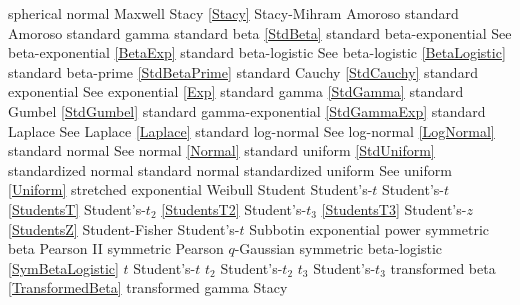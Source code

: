 spherical normal				\dotfill	Maxwell							\ncite	%
Stacy 						\dotfill	\eqref{Stacy} 						\ncite	%
Stacy-Mihram					\dotfill	Amoroso							\ncite	%
standard Amoroso				\dotfill	standard gamma 					\ncite	%
standard beta					\dotfill	\eqref{StdBeta} 					\ncite	%
standard beta-exponential			\dotfill	See beta-exponential \eqref{BetaExp}	\ncite	%
standard beta-logistic			\dotfill	See beta-logistic \eqref{BetaLogistic}		\ncite	%
standard beta-prime				\dotfill	\eqref{StdBetaPrime}				\ncite	%
standard Cauchy				\dotfill	\eqref{StdCauchy} 					\ncite	%
standard exponential				\dotfill	See exponential \eqref{Exp} 			\ncite	%
standard gamma 				\dotfill	\eqref{StdGamma} 					\ncite	%
standard Gumbel 				\dotfill	\eqref{StdGumbel} 					\ncite	%
standard gamma-exponential		\dotfill	\eqref{StdGammaExp} 				\ncite	%
standard Laplace				\dotfill	See Laplace \eqref{Laplace}			\ncite	%
standard log-normal				\dotfill	See log-normal \eqref{LogNormal} 		\ncite	%
standard normal 				\dotfill	See normal \eqref{Normal} 			\ncite	%
standard uniform				\dotfill	\eqref{StdUniform}					\ncite	%
standardized normal 				\dotfill	standard normal					\ncite	%
standardized uniform 			\dotfill	See uniform \eqref{Uniform}			\ncite	%
stretched exponential 			\dotfill	Weibull 								
Student						\dotfill 	Student's-$t$						\ncite	%
Student's-$t$					\dotfill	\eqref{StudentsT}  					\ncite	%
Student's-$t_2$					\dotfill	\eqref{StudentsT2}  					\ncite	%
Student's-$t_3$					\dotfill	\eqref{StudentsT3}  					\ncite	
Student's-$z$					\dotfill	\eqref{StudentsZ}					\ncite	%
Student-Fisher					\dotfill	Student's-$t$							%
Subbotin						\dotfill	exponential power					\ncite
symmetric beta					\dotfill	Pearson II							\ncite	%
symmetric Pearson				\dotfill	$q$-Gaussian						\mcite{\self}		%
symmetric beta-logistic			\dotfill	\eqref{SymBetaLogistic}				\mcite{\self}
%
$t$							\dotfill	Student's-$t$ 						\ncite	%
$t_2$						\dotfill	Student's-$t_2$ 					\ncite	%
$t_3$						\dotfill	Student's-$t_3$ 					\ncite
transformed beta				\dotfill	\eqref{TransformedBeta} 				\ncite	%
transformed gamma				\dotfill	Stacy 							\ncite %
